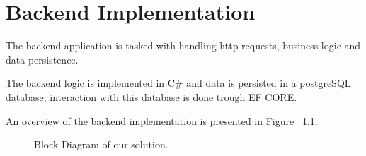 %
%
\chapter{Backend Implementation} \label{cap:backend_implementation}

The backend application is tasked with handling http requests, business logic and data persistence. 

The backend logic is implemented in C{\#} and data is persisted in a postgreSQL database, interaction with this database is done trough EF CORE.

An overview of the backend implementation is presented in Figure ~\ref{fig:backend_implementation}.
\begin{figure}[h]
	\begin{center}
	\end{center}
	\caption{Block Diagram of our solution.}\label{fig:backend_implementation}
\end{figure}


